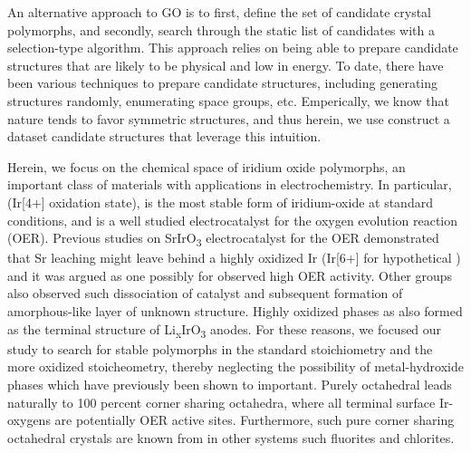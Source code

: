 An alternative approach to GO is to first, define the set of candidate crystal polymorphs, and secondly, search through the static list of candidates with a selection-type algorithm.
%
This approach relies on being able to prepare candidate structures that are likely to be physical and low in energy.
To date, there have been various techniques to prepare candidate structures, including generating structures randomly, enumerating space groups, etc.
%
Emperically, we know that nature tends to favor symmetric structures, and thus herein, we use construct a dataset candidate structures that leverage this intuition.


Herein, we focus on the chemical space of iridium oxide polymorphs,
an important class of materials with applications in electrochemistry.
%
In particular, \rIrOtwo (Ir[4+] oxidation state), is the most stable form of iridium-oxide at standard conditions,
and is a well studied electrocatalyst for the oxygen evolution reaction (OER).
\cite{Seitz2016,Lee2012a,McCrory2015,Trotochaud2012,Danilovic2014,Carmo2013,Miles1978,Beni1979}
%
Previous studies on SrIrO\textsubscript{3} electrocatalyst for the OER demonstrated that Sr leaching might leave behind a highly oxidized Ir (Ir[6+] for hypothetical \IrOthree) and it was argued as one possibly for observed high OER activity.\cite{Seitz2016}
%
Other groups also observed such dissociation of \IrOx catalyst and subsequent formation of amorphous-like layer of unknown structure. \cite{Pearce2017}
%
Highly oxidized \IrOthree phases as also formed as the terminal structure of Li\textsubscript{x}IrO\textsubscript{3} anodes.\cite{Pearce2017}
%
For these reasons, we focused our study to search for stable polymorphs in the standard \IrOtwo stoichiometry and the more oxidized \IrOthree stoicheometry, thereby neglecting the possibility of metal-hydroxide phases which have previously been shown to important.
%
Purely octahedral \IrOthree leads naturally to 100 percent corner sharing octahedra, where all terminal surface Ir-oxygens are potentially OER active sites.
%
Furthermore, such pure corner sharing octahedral crystals are known from in other systems such fluorites and chlorites.


